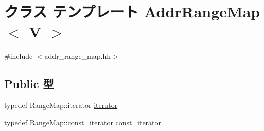 \hypertarget{classAddrRangeMap}{
\section{クラス テンプレート AddrRangeMap$<$ V $>$}
\label{classAddrRangeMap}
}


{\ttfamily \#include $<$addr\_\-range\_\-map.hh$>$}\subsection*{Public 型}
\begin{DoxyCompactItemize}
\item 
typedef RangeMap::iterator \hyperlink{classAddrRangeMap_ae61c5513b9ac04615ba7927f47c3ec69}{iterator}
\item 
typedef RangeMap::const\_\-iterator \hyperlink{classAddrRangeMap_ab049cdad9a17cf714c462bfb9f5dbb6e}{const\_\-iterator}
\end{DoxyCompactItemize}

